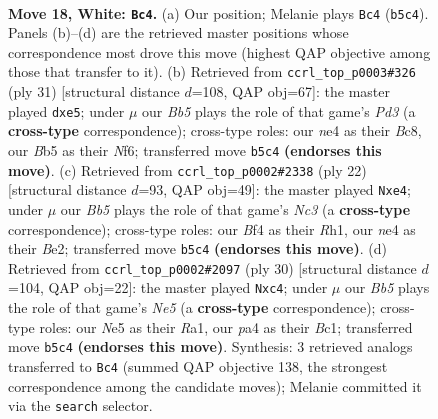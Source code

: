 \documentclass[11pt]{article}
\begin{document}
\clearpage

\begin{figure}[p]\centering
\begin{subfigure}{0.46\textwidth}\centering
\resizebox{\linewidth}{!}{%
\newchessgame
\chessboard[
  setfen={rn1r1k2/5pb1/2p1b1p1/1B2N3/p3nB1p/P7/RPP2PPP/1N2RK2 w - - 1 18},
  showmover=false,
  pgfstyle=straightmove, color=movearrow, markmove={b5-c4}
]}
\caption{}
\end{subfigure}\hfill
\begin{subfigure}{0.46\textwidth}\centering
\resizebox{\linewidth}{!}{%
\newchessgame
\chessboard[
  setfen={r1b2rk1/4bppp/p1np1n2/3NP3/4P3/P3BN2/2P3PP/2KR1B1R b - - 0 16},
  showmover=false,
  pgfstyle=straightmove, color=movearrow, markmove={d6-e5}
]}
\caption{}
\end{subfigure}
\\[4pt]
\begin{subfigure}{0.46\textwidth}\centering
\resizebox{\linewidth}{!}{%
\newchessgame
\chessboard[
  setfen={rn1r2k1/ppp2pb1/4b1pp/4N3/2P1n3/2N5/PP1BBPPP/R3K2R w KQ - 0 12},
  showmover=false,
  pgfstyle=straightmove, color=movearrow, markmove={c3-e4}
]}
\caption{}
\end{subfigure}\hfill
\begin{subfigure}{0.46\textwidth}\centering
\resizebox{\linewidth}{!}{%
\newchessgame
\chessboard[
  setfen={r3k2r/1p2bpp1/2p1pn2/4Nb1p/p1nP3P/6P1/PP2PPB1/R1B2RK1 w kq - 0 16},
  showmover=false,
  pgfstyle=straightmove, color=movearrow, markmove={e5-c4}
]}
\caption{}
\end{subfigure}
\caption{\textbf{Move 18, White: \texttt{Bc4}.} (a) Our position; Melanie plays \texttt{Bc4} (\texttt{b5c4}). Panels (b)--(d) are the retrieved master positions whose correspondence most drove this move (highest QAP objective among those that transfer to it). (b) Retrieved from \texttt{ccrl\_top\_p0003\#326} (ply 31) [structural distance $d$=108, QAP obj=67]: the master played \texttt{dxe5}; under $\mu$ our \emph{Bb5} plays the role of that game's \emph{Pd3} (a \textbf{cross-type} correspondence); cross-type roles: our \emph{n}e4 as their \emph{B}c8, our \emph{B}b5 as their \emph{N}f6; transferred move \texttt{b5c4} \textbf{(endorses this move)}. (c) Retrieved from \texttt{ccrl\_top\_p0002\#2338} (ply 22) [structural distance $d$=93, QAP obj=49]: the master played \texttt{Nxe4}; under $\mu$ our \emph{Bb5} plays the role of that game's \emph{Nc3} (a \textbf{cross-type} correspondence); cross-type roles: our \emph{B}f4 as their \emph{R}h1, our \emph{n}e4 as their \emph{B}e2; transferred move \texttt{b5c4} \textbf{(endorses this move)}. (d) Retrieved from \texttt{ccrl\_top\_p0002\#2097} (ply 30) [structural distance $d$=104, QAP obj=22]: the master played \texttt{Nxc4}; under $\mu$ our \emph{Bb5} plays the role of that game's \emph{Ne5} (a \textbf{cross-type} correspondence); cross-type roles: our \emph{N}e5 as their \emph{R}a1, our \emph{p}a4 as their \emph{B}c1; transferred move \texttt{b5c4} \textbf{(endorses this move)}. Synthesis: 3 retrieved analogs transferred to \texttt{Bc4} (summed QAP objective 138, the strongest correspondence among the candidate moves); Melanie committed it via the \texttt{search} selector.}
\label{fig:thought-m34}
\end{figure}
\end{document}
